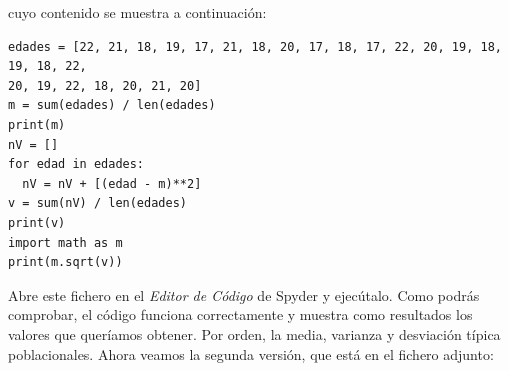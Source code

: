 \documentclass[10pt,a4paper]{article}\usepackage[]{graphicx}\usepackage[]{color}
\makeatletter
\newenvironment{kframe}{%
 \def\at@end@of@kframe{}%
 \ifinner\ifhmode%
  \def\at@end@of@kframe{\end{minipage}}%
  \begin{minipage}{\columnwidth}%
 \fi\fi%
 \def\FrameCommand##1{\hskip\@totalleftmargin \hskip-\fboxsep
 \colorbox{shadecolor}{##1}\hskip-\fboxsep
     \hskip-\linewidth \hskip-\@totalleftmargin \hskip\columnwidth}%
 \MakeFramed {\advance\hsize-\width
   \@totalleftmargin\z@ \linewidth\hsize
   \@setminipage}}%
 {\par\unskip\endMakeFramed%
 \at@end@of@kframe}
\newenvironment{knitrout}{}{} %
\newcounter {cont01}
\makeatother
\begin{document}
\begin{center}
\end{center}
cuyo contenido se muestra a continuación:
\begin{knitrout}
\color{fgcolor}\begin{kframe}
\begin{verbatim}
edades = [22, 21, 18, 19, 17, 21, 18, 20, 17, 18, 17, 22, 20, 19, 18, 19, 18, 22, 
20, 19, 22, 18, 20, 21, 20]
m = sum(edades) / len(edades)
print(m)
nV = []
for edad in edades:
  nV = nV + [(edad - m)**2] 
v = sum(nV) / len(edades)
print(v)
import math as m
print(m.sqrt(v))
\end{verbatim}
\end{kframe}
\end{knitrout}
Abre este fichero en el {\em Editor de Código} de Spyder y ejecútalo. Como podrás comprobar, el código funciona correctamente y muestra como resultados los valores que queríamos obtener. Por orden, la media, varianza y desviación típica poblacionales. Ahora veamos la segunda versión, que está en el fichero adjunto:
\end{document}
